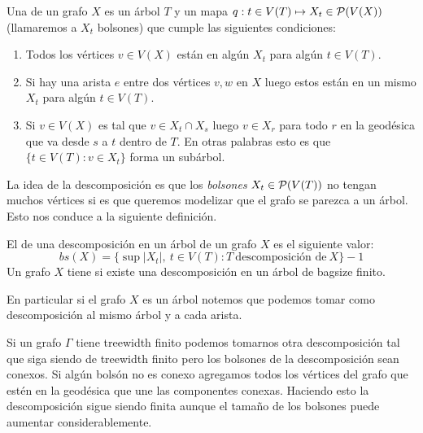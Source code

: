 \documentclass[tesis.tex]{subfiles}
\begin{document}
\begin{deff}
	 Una  de un grafo $X$ es un árbol $T$ y un mapa $q:t \in V(T) \mapsto X_t \in {\cal P}(V(X))$ (llamaremos a $X_t$ bolsones) que cumple las siguientes condiciones:
	\begin{enumerate}
		\item Todos los vértices $v \in V(X)$ están en algún $X_t$ para algún $t \in V(T)$. 
		\item Si hay una arista $e$ entre dos vértices $v,w$ en $X$ luego estos están en un mismo $X_t$ para algún $t \in V(T)$.
		\item Si $v \in V(X)$ es tal que $v \in X_t \cap X_s$ luego $v \in X_r$ para todo $r$ en la geodésica que va desde $s$ a $t$ dentro de $T$. En otras palabras esto es que $\{ t \in V(T) :  v \in X_t \}$ forma un subárbol. 
	\end{enumerate} 
\end{deff}
\smallskip

La idea de la descomposición es que los \emph{bolsones} $X_t \in {\cal P}(V(T))$ no tengan muchos vértices si es que queremos modelizar que el grafo se parezca a un árbol. Esto nos conduce a la siguiente definición.

\begin{deff}
El  de una descomposición en un árbol de un grafo $X$ es el siguiente valor:
	\begin{equation*}
		bs(X) = \{ \sup |X_t|, \ t \in V(T) : T \ \text{descomposición de} \ X  \} - 1
	\end{equation*}
Un grafo $X$ tiene  si existe una descomposición en un árbol de bagsize finito.	
\end{deff}
\begin{obs}
 En particular si el grafo $X$ es un árbol notemos que podemos tomar como descomposición al mismo árbol y a cada arista.
\end{obs}


\begin{obs}
	Si un grafo $\Gamma$ tiene treewidth finito podemos tomarnos otra descomposición tal que siga siendo de treewidth finito pero los bolsones de la descomposición sean conexos. Si algún bolsón no es conexo agregamos todos los vértices del grafo que estén en la geodésica que une las componentes conexas. Haciendo esto la descomposición sigue siendo finita aunque el tamaño de los bolsones puede aumentar considerablemente.
\end{obs}
\end{document}
